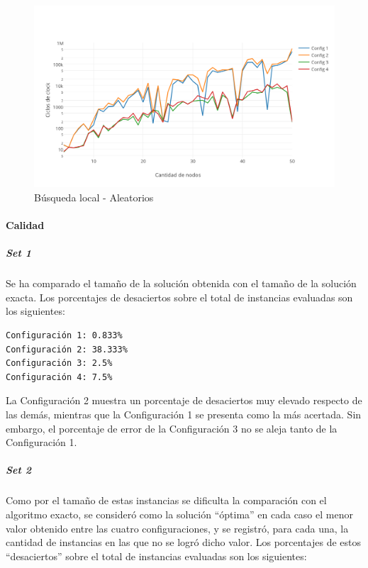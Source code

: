 \begin{figure}[htb]
	\begin{center}
    		\includegraphics[scale=0.8]{imagenes/busqlocal-aleatorios-tiempo.png}
	\end{center}
	\caption{Búsqueda local - Aleatorios}\label{fig:3D}
\end{figure}

\paragraph{Calidad} 

\subparagraph{Set 1} Se ha comparado el tamaño de la solución obtenida con el tamaño de la solución exacta.  Los porcentajes de desaciertos sobre el total de instancias evaluadas son los siguientes:

\begin{verbatim}
Configuración 1: 0.833%
Configuración 2: 38.333%
Configuración 3: 2.5%
Configuración 4: 7.5%
\end{verbatim}

La Configuración 2 muestra un porcentaje de desaciertos muy elevado respecto de las demás, mientras que la Configuración 1 se presenta como la más acertada.  Sin embargo, el porcentaje de error de la Configuración 3 no se aleja tanto de la Configuración 1.

\subparagraph{Set 2} Como por el tamaño de estas instancias se dificulta la comparación con el algoritmo exacto, se consideró como la solución ``óptima'' en cada caso el menor valor obtenido entre las cuatro configuraciones, y se registró, para cada una, la cantidad de instancias en las que no se logró dicho valor. Los porcentajes de estos ``desaciertos'' sobre el total de instancias evaluadas son los siguientes:

